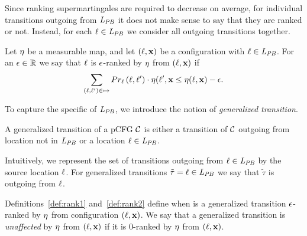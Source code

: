 Since ranking supermartingales are required to decrease on average, for 
individual transitions outgoing from $\mathit{L}_{\mathit{PB}}$ it does not make sense to say 
that they are ranked or not. Instead, for each $\ell\in\mathit{L}_{\mathit{PB}}$ we consider all 
outgoing transitions together.

\begin{definition}
\label{def:rank2}
Let $\eta$ be a measurable map, and let $(\ell,\mathbf{x})$ be a configuration with
$\ell\in \mathit{L}_{\mathit{PB}}$. For an $\epsilon\in \mathbb{R}$ we say that $\ell$ is $\epsilon$-ranked 
by 
$\eta$ from $(\ell,\mathbf{x})$ if 
$$\sum_{(\ell,\ell')\in\mapsto} 
		Pr_{\ell}\left(\ell,\ell'\right)\cdot
		\eta(\ell',\mathbf{x}\leq \eta(\ell,\mathbf{x})-\epsilon.$$
\end{definition}

To capture the specific of $\mathit{L}_{\mathit{PB}}$, we introduce the 
notion of \emph{generalized transition}.

\begin{definition}
A generalized transition of a pCFG $\mathcal{C}$ is either a transition of $\mathcal{C}$ 
outgoing 
from location not in $\mathit{L}_{\mathit{PB}}$ or a location $\ell\in\mathit{L}_{\mathit{PB}}$.
\end{definition}

Intuitively, we represent the set of transitions outgoing from $\ell\in\mathit{L}_{\mathit{PB}}$ 
by the source location $\ell$.  For generalized transitions 
$\tilde{\tau}=\ell\in\mathit{L}_{\mathit{PB}}$ we say that $\tilde{\tau}$ is outgoing from 
$\ell$.

Definitions~\ref{def:rank1} and~\ref{def:rank2} 
define when is a generalized transition $\epsilon$-ranked by $\eta$ from 
configuration $(\ell,\mathbf{x})$. We say that a 
generalized transition is \emph{unaffected} by $\eta$ from $(\ell,\mathbf{x})$ if 
it is $0$-ranked by $\eta$ from $(\ell,\mathbf{x})$.

